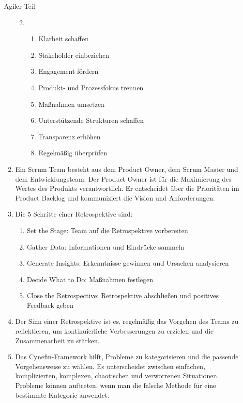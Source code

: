 \documentclass{article}
\begin{document}
\begin{exercise}{Agiler Teil}
\begin{solution}
\begin{enumerate}
\begin{enumerate}
\begin{itemize}
\begin{enumerate}
                            \end{enumerate}
                    \end{itemize}
              \item
                    \begin{enumerate}
                      \item Klarheit schaffen
                      \item Stakeholder einbeziehen
                      \item Engagement fördern
                      \item Produkt- und Prozessfokus trennen
                      \item Maßnahmen umsetzen
                      \item Unterstützende Strukturen schaffen
                      \item Transparenz erhöhen
                      \item Regelmäßig überprüfen
                    \end{enumerate}
            \end{enumerate}
      \item Ein Scrum Team besteht aus dem Product Owner, dem Scrum Master und dem Entwicklungsteam. Der Product Owner ist für die Maximierung des Wertes des Produkts verantwortlich. Er entscheidet über die Prioritäten im Product Backlog und kommuniziert die Vision und Anforderungen.
      \item Die 5 Schritte einer Retrospektive sind:
            \begin{enumerate}
              \item Set the Stage: Team auf die Retrospektive vorbereiten
              \item Gather Data: Informationen und Eindrücke sammeln
              \item Generate Insights: Erkenntnisse gewinnen und Ursachen analysieren
              \item Decide What to Do: Maßnahmen festlegen
              \item Close the Retrospective: Retrospektive abschließen und positives Feedback geben
            \end{enumerate}
      \item Der Sinn einer Retrospektive ist es, regelmäßig das Vorgehen des Teams zu reflektieren, um kontinuierliche Verbesserungen zu erzielen und die Zusammenarbeit zu stärken.
      \item Das Cynefin-Framework hilft, Probleme zu kategorisieren und die passende Vorgehensweise zu wählen. Es unterscheidet zwischen einfachen, komplizierten, komplexen, chaotischen und verworrenen Situationen. Probleme können auftreten, wenn man die falsche Methode für eine bestimmte Kategorie anwendet.
    \end{enumerate}
  \end{solution}
\end{exercise}
\end{document}
